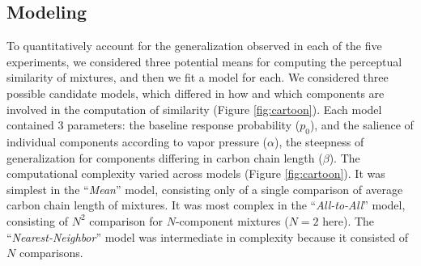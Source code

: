 \subsection*{Modeling}
\label{sec:results_modeling}
To quantitatively account for the generalization observed in each of the five experiments, we considered three potential means for computing the perceptual similarity of mixtures, and then we fit a model for each.  
We considered three possible candidate models, which differed in how and which components are involved in the computation of similarity (Figure \ref{fig:cartoon}).  
Each model contained 3 parameters: the baseline response probability ($p_0$), and the salience of individual components according to vapor pressure ($\alpha$), the steepness of generalization for components differing in carbon chain length ($\beta$).  
The computational complexity varied across models (Figure \ref{fig:cartoon}).  It was simplest in the ``\textit{Mean}'' model, consisting only of a single comparison of average carbon chain length of mixtures.  
It was most complex in the ``\textit{All-to-All}'' model, consisting of $N^2$ comparison for $N$-component mixtures ($N=2$ here).  The ``\textit{Nearest-Neighbor}'' model was intermediate in complexity because it consisted of $N$ comparisons.  